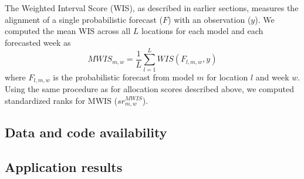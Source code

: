 \documentclass{article}\usepackage[]{graphicx}\usepackage[]{xcolor}
\makeatletter
\newenvironment{kframe}{%
 \def\at@end@of@kframe{}%
 \ifinner\ifhmode%
  \def\at@end@of@kframe{\end{minipage}}%
  \begin{minipage}{\columnwidth}%
 \fi\fi%
 \def\FrameCommand##1{\hskip\@totalleftmargin \hskip-\fboxsep
 \colorbox{shadecolor}{##1}\hskip-\fboxsep
     \hskip-\linewidth \hskip-\@totalleftmargin \hskip\columnwidth}%
 \MakeFramed {\advance\hsize-\width
   \@totalleftmargin\z@ \linewidth\hsize
   \@setminipage}}%
 {\par\unskip\endMakeFramed%
 \at@end@of@kframe}
\newenvironment{knitrout}{}{} %
\makeatother
\begin{document}
The Weighted Interval Score (WIS), as described in earlier sections, measures the alignment of a single probabilistic forecast ($F$) with an observation ($y$).
We computed the mean WIS across all $L$ locations for each model and each forecasted week as
\begin{equation}
MWIS_{m,w} = \frac{1}{L}\sum_{l=1}^L WIS(F_{l,m,w},y)
\end{equation}
where $F_{l,m,w}$ is the probabilistic forecast from model $m$ for location $l$ and week $w$.
Using the same procedure as for allocation scores described above, we computed standardized ranks for MWIS ($sr_{m,w}^{MWIS}$).

\subsection{Data and code availability}

\subsection{Application results}

\begin{knitrout}
\color{fgcolor}\begin{kframe}


{\ttfamily\noindent\bfseries{}}

{\ttfamily\noindent\bfseries\color{errorcolor}{\#\# Error in group\_by(Kat15k\_alloscores, model, reference\_date): object 'Kat15k\_alloscores' not found}}

{\ttfamily\noindent\bfseries\color{errorcolor}{\#\# Error in unique(alloscore\_data\_summaries\$model): object 'alloscore\_data\_summaries' not found}}

{\ttfamily\noindent\bfseries\color{errorcolor}{\#\# Error in `filter()`:\\\#\# i In argument: `model \%in\% alloscore\_models`.\\\#\# Caused by error in `model \%in\% alloscore\_models`:\\\#\# ! object 'alloscore\_models' not found}}\end{kframe}
\end{knitrout}
\end{document}

